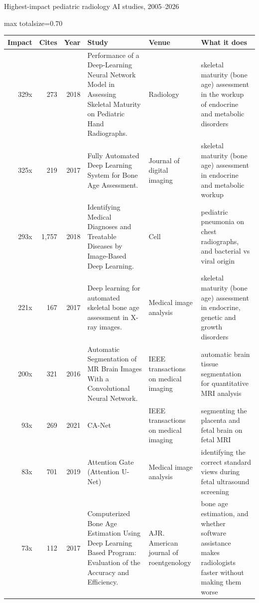\documentclass[aspectratio=169]{beamer}
\renewcommand{\arraystretch}{1.08}
\begin{document}
\begin{frame}[category=Journals/Preprints]{Highest-impact pediatric radiology AI studies, 2005--2026}
\tiny
\begin{adjustbox}{max totalsize={\textwidth}{0.70\textheight}}
\renewcommand{\arraystretch}{1.2}
\begin{tabular}{|r|r|r|>{\raggedright\arraybackslash}p{}|>{\raggedright\arraybackslash}p{}|>{\raggedright\arraybackslash}p{}|}
\hline \textbf{Impact} & \textbf{Cites} & \textbf{Year} & \textbf{Study} & \textbf{Venue} & \textbf{What it does} \\ \hline
329x & 273 & 2018 & Performance of a Deep-Learning Neural Network Model in Assessing Skeletal Maturity on Pediatric Hand Radiographs. & Radiology & skeletal maturity (bone age) assessment in the workup of endocrine and metabolic disorders \\ \hline
325x & 219 & 2017 & Fully Automated Deep Learning System for Bone Age Assessment. & Journal of digital imaging & skeletal maturity (bone age) assessment in endocrine and metabolic workup \\ \hline
293x & 1,757 & 2018 & Identifying Medical Diagnoses and Treatable Diseases by Image-Based Deep Learning. & Cell & pediatric pneumonia on chest radiographs, and bacterial vs viral origin \\ \hline
221x & 167 & 2017 & Deep learning for automated skeletal bone age assessment in X-ray images. & Medical image analysis & skeletal maturity (bone age) assessment in endocrine, genetic and growth disorders \\ \hline
200x & 321 & 2016 & Automatic Segmentation of MR Brain Images With a Convolutional Neural Network. & IEEE transactions on medical imaging & automatic brain tissue segmentation for quantitative MRI analysis \\ \hline
93x & 269 & 2021 & CA-Net & IEEE transactions on medical imaging & segmenting the placenta and fetal brain on fetal MRI \\ \hline
83x & 701 & 2019 & Attention Gate (Attention U-Net) & Medical image analysis & identifying the correct standard views during fetal ultrasound screening \\ \hline
73x & 112 & 2017 & Computerized Bone Age Estimation Using Deep Learning Based Program: Evaluation of the Accuracy and Efficiency. & AJR. American journal of roentgenology & bone age estimation, and whether software assistance makes radiologists faster without making them worse \\ \hline

\end{tabular}
\end{adjustbox}
\end{frame}
\end{document}
